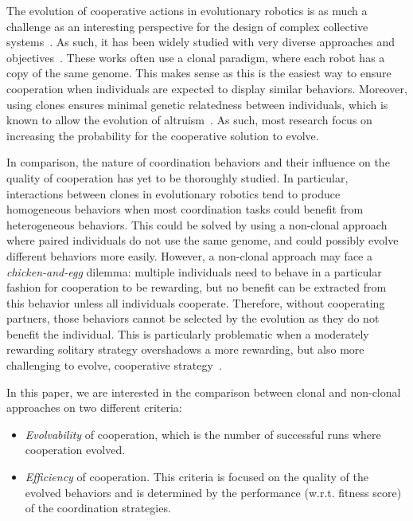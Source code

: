   The evolution of cooperative actions in evolutionary robotics is as much a challenge as an interesting perspective for the design of complex collective systems~\cite{Doncieux2015}. As such, it has been widely studied with very diverse approaches and objectives~\cite{Waibel2009, Hauert2014, Trianni2007, Lichocki2012}. These works often use a clonal paradigm, where each robot has a copy of the same genome. This makes sense as this is the easiest way to ensure cooperation when individuals are expected to display similar behaviors. Moreover, using clones ensures minimal genetic relatedness between individuals, which is known to allow the evolution of altruism~\cite{Waibel2011, Montanier2011}. As such, most research focus on increasing the probability for the cooperative solution to evolve.

  In comparison, the nature of coordination behaviors and their influence on the quality of cooperation has yet to be thoroughly studied. In particular, interactions between clones in evolutionary robotics tend to produce homogeneous behaviors when most coordination tasks could benefit from heterogeneous behaviors. This could be solved by using a non-clonal approach where paired individuals do not use the same genome, and could possibly evolve different behaviors more easily. However, a non-clonal approach may face a \emph{chicken-and-egg} dilemma: multiple individuals need to behave in a particular fashion for cooperation to be rewarding, but no benefit can be extracted from this behavior unless all individuals cooperate. Therefore, without cooperating partners, those behaviors cannot be selected by the evolution as they do not benefit the individual. This is particularly problematic when a moderately rewarding solitary strategy overshadows a more rewarding, but also more challenging to evolve, cooperative strategy~\cite{Skyrms2004}.

  In this paper, we are interested in the comparison between clonal and non-clonal approaches on two different criteria:
 \begin{itemize}
    \item{\emph{Evolvability} of cooperation, which is the number of successful runs where cooperation evolved.}
    \item{\emph{Efficiency} of cooperation. This criteria is focused on the quality of the evolved behaviors and is determined by the   performance (w.r.t. fitness score) of the coordination strategies.}
  \end{itemize}

